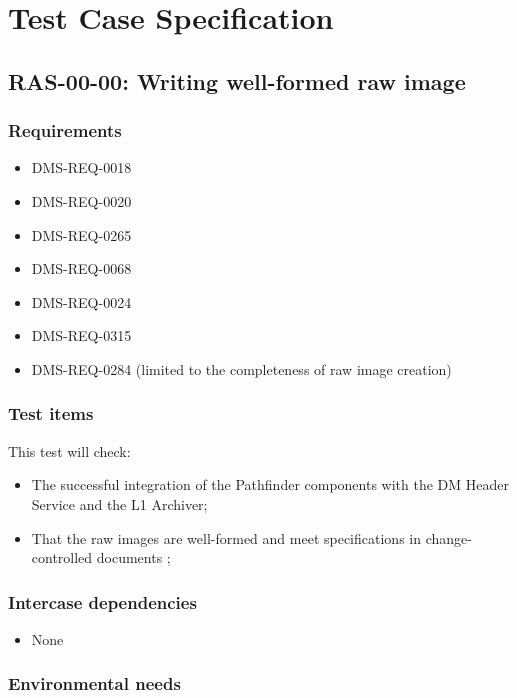 \documentclass[DM,lsstdraft,STS,toc]{lsstdoc}
\begin{document}
\section{Test Case Specification}


\subsection{RAS-00-00: Writing well-formed raw image}
\label{ras-00-00}


\subsubsection{Requirements}

\begin{itemize}
\item{DMS-REQ-0018}
\item{DMS-REQ-0020}
\item{DMS-REQ-0265}
\item{DMS-REQ-0068}
\item{DMS-REQ-0024}
\item{DMS-REQ-0315}
\item{DMS-REQ-0284 (limited to the completeness of raw image creation)}
\end{itemize}


\subsubsection{Test items}
This test will check:


\begin{itemize}
\item{The successful integration of the Pathfinder components with the DM Header Service and the L1 Archiver;}
\item{That the raw images are well-formed and meet specifications in change-controlled documents ;}
\end{itemize}


\subsubsection{Intercase dependencies}
\begin{itemize}
\item{None}
\end{itemize}


\subsubsection{Environmental needs}
\end{document}
